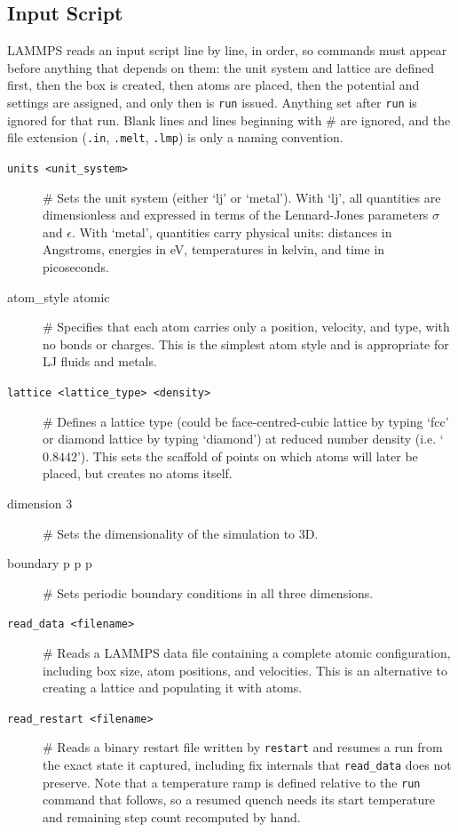 \documentclass{article}
\begin{document}
\subsection{Input Script}
\label{InputScript}
LAMMPS reads an input script line by line, in order, so commands must appear before anything that depends on them: the unit system and lattice are defined first, then the box is created, then atoms are placed, then the potential and settings are assigned, and only then is \texttt{run} issued. Anything set after \texttt{run} is ignored for that run. Blank lines and lines beginning with \# are ignored, and the file extension (\texttt{.in}, \texttt{.melt}, \texttt{.lmp}) is only a naming convention.
\begin{description}
    \item[\texttt{units <unit\_system>}] \# Sets the unit system (either `lj' or `metal'). With `lj', all quantities are dimensionless and expressed in terms of the Lennard-Jones parameters $\sigma$ and $\epsilon$. With `metal', quantities carry physical units: distances in Angstroms, energies in eV, temperatures in kelvin, and time in picoseconds.
    \item[atom\_style atomic] \# Specifies that each atom carries only a position, velocity, and type, with no bonds or charges. This is the simplest atom style and is appropriate for LJ fluids and metals.
    \item[\texttt{lattice <lattice\_type> <density>}] \# Defines a lattice type (could be face-centred-cubic lattice by typing `fcc' or diamond lattice by typing `diamond') at reduced number density (i.e. `$0.8442$'). This sets the scaffold of points on which atoms will later be placed, but creates no atoms itself.
    \item[dimension 3] \# Sets the dimensionality of the simulation to 3D.
    \item[boundary p p p] \# Sets periodic boundary conditions in all three dimensions.
    \item[\texttt{read\_data <filename>}] \# Reads a LAMMPS data file containing a complete atomic configuration, including box size, atom positions, and velocities. This is an alternative to creating a lattice and populating it with atoms.
    \item[\texttt{read\_restart <filename>}] \# Reads a binary restart file written by \texttt{restart} and resumes a run from the exact state it captured, including fix internals that \texttt{read\_data} does not preserve. Note that a temperature ramp is defined relative to the \texttt{run} command that follows, so a resumed quench needs its start temperature and remaining step count recomputed by hand.

\end{description}
\end{document}
